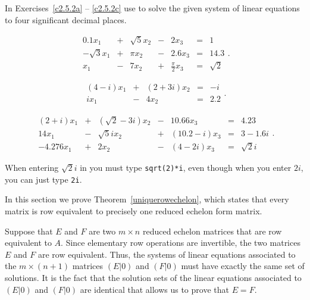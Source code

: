 \documentclass{ximera}
\begin{document}
\CEXER

\noindent In Exercises~\ref{c2.5.2a} -- \ref{c2.5.2c} use \Matlab to
solve the given system of linear equations to four significant decimal places.
\begin{exercise} \label{c2.5.2a}
\[
\begin{array}{rcrcrcr}
     0.1 x_1 & + & \sqrt{5}x_2 & - &   2 x_3 & = & 1 \\
-\sqrt{3}x_1 & + &     \pi x_2 & - & 2.6 x_3 & = & 14.3 \\
         x_1 & - &       7 x_2 & + & \frac{\pi}{2}x_3 & = & \sqrt{2}
\end{array}.
\]
\end{exercise}
\begin{exercise} \label{c2.5.2b}
\[
\begin{array}{rcrcr}
(4-i)x_1 & + & (2+3i)x_2 & = &  -i \\
   i x_1 & - &     4 x_2 & = & 2.2
\end{array}.
\]
\end{exercise}
\begin{exercise} \label{c2.5.2c}
\[
\begin{array}{rcrcrcr}
 (2+i) x_1 & + & (\sqrt{2}-3i)x_2 & - &    10.66 x_3 & = &     4.23 \\
    14 x_1 & - &    \sqrt{5}i x_2 & + & (10.2-i) x_3 & = &    3-1.6i \\
-4.276 x_1 & + &            2 x_2 & - &   (4-2i) x_3 & = & \sqrt{2}i
\end{array}.
\]

  When entering $\sqrt{2}i$ in \Matlab you must type
{\tt sqrt(2)*i}, even though when you enter $2i$, you can just type
{\tt 2i}.
\end{exercise}


\label{S:uniquerowechelon}


In this section we prove Theorem~\ref{uniquerowechelon}, which
states that every matrix is row equivalent to precisely one
reduced echelon form matrix.  

Suppose that $E$ and $F$ are two $m\times n$ reduced echelon
matrices that are row equivalent to $A$.  Since elementary row
operations are invertible, the two matrices $E$ and $F$ are
row equivalent.  Thus, the systems of linear equations associated to 
the $m\times (n+1)$ matrices $(E|0)$ and $(F|0)$ must have exactly the
same set of solutions.  It is the fact that the solution sets
of the linear equations associated to $(E|0)$ and $(F|0)$ are
identical that allows us to prove that $E=F$.
\end{document}
